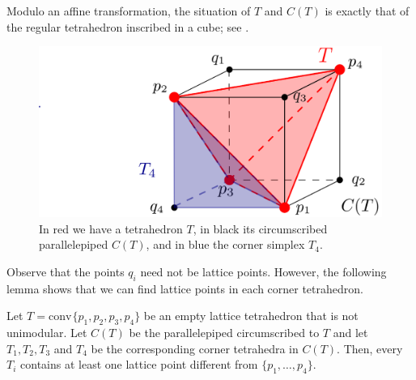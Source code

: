 \documentclass[12pt]{article}
\newcommand{\conv}{\ensuremath{\mathrm{conv}}\hspace{1pt}}
\begin{document}
Modulo an affine transformation, the situation of $T$ and $C(T)$ is exactly that of the regular tetrahedron inscribed in a cube; see . 
%
\begin{figure}[htb]
\includegraphics[scale=.25]{circumscribed_parall}
\caption{In red we have a tetrahedron $T$, in black its circumscribed parallelepiped $C(T)$, and in blue the corner simplex $T_4$.}
\label{fig:circumscribed_parall}
\end{figure}

Observe that the points $q_i$ need not be lattice points. However, the following lemma shows that we can find lattice points in each corner tetrahedron.
\begin{lemma}
\label{lemma:corner}
Let $T=\conv\{p_1,p_2,p_3,p_4\}$ be an empty lattice tetrahedron that is not unimodular. Let $C(T)$ be the parallelepiped circumscribed to $T$ and let $T_1, T_2,T_3$ and $T_4$ be the corresponding corner tetrahedra in $C(T)$. Then, every $T_i$ contains at least one lattice point different from $\{p_1,\dots,p_4\}$.
\end{lemma}
\end{document}
